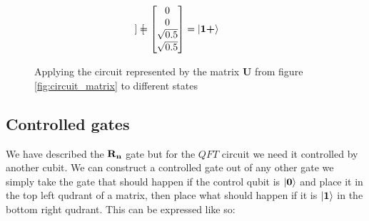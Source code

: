 \begin{figure}[H]
\begin{alignat*}{2}
\begin{bmatrix}
        \end{bmatrix}
        =
        \begin{bmatrix}
            0             \\
            0             \\
            \sqrt{0.5}    \\
            \sqrt{0.5}    \\
        \end{bmatrix}&=\ket{\mathbf{1}\textbf{+}}
    \end{alignat*}
    \caption{Applying the circuit represented by the matrix $\mathbf{U}$ from figure \ref{fig:circuit_matrix} to different states}
    \label{fig:applying_circuit}
\end{figure}


\subsection{Controlled gates}
\newcommand{\qtcr}[1]{\mathbf{CR_{#1}}}
We have described the $\mathbf{R_{n}}$ gate but for the $QFT$ circuit we need it controlled by another cubit. We can construct a controlled gate out of any other gate we simply take the gate that should happen if the control qubit is $\ket{\mathbf{0}}$ and place it in the top left qudrant of a matrix, then place what should happen if it is $\ket{\mathbf{1}}$ in the bottom right qudrant. 
This can be expressed like so: 

